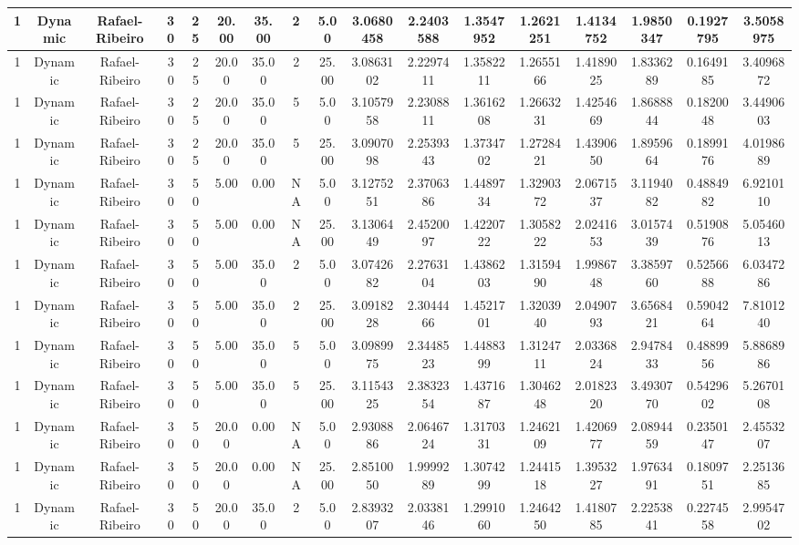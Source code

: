 \documentclass[a4paper]{article}
\begin{document}
\begin{center}
\begin{tabular}{ | c | c | c | c | c | c | c | c | c | c | c | c | c | c | c | c | c | }
		1	&	Dynamic	&	Rafael-Ribeiro	&	30	&	25	&	20.00	&	35.00	&	2	&	5.00	&	3.0680458	&	2.2403588	&	1.3547952	&	1.2621251	&	1.4134752	&	1.9850347	&	0.1927795	&	3.5058975 \\
		\hline
		1	&	Dynamic	&	Rafael-Ribeiro	&	30	&	25	&	20.00	&	35.00	&	2	&	25.00	&	3.0863102	&	2.2297411	&	1.3582211	&	1.2655166	&	1.4189025	&	1.8336289	&	0.1649185	&	3.4096872 \\
		\hline
		1	&	Dynamic	&	Rafael-Ribeiro	&	30	&	25	&	20.00	&	35.00	&	5	&	5.00	&	3.1057958	&	2.2308811	&	1.3616208	&	1.2663231	&	1.4254669	&	1.8688844	&	0.1820048	&	3.4490603 \\
		\hline
		1	&	Dynamic	&	Rafael-Ribeiro	&	30	&	25	&	20.00	&	35.00	&	5	&	25.00	&	3.0907098	&	2.2539343	&	1.3734702	&	1.2728421	&	1.4390650	&	1.8959664	&	0.1899176	&	4.0198689 \\
		\hline
		1	&	Dynamic	&	Rafael-Ribeiro	&	30	&	50	&	5.00	&	0.00	&	NA	&	5.00	&	3.1275251	&	2.3706386	&	1.4489734	&	1.3290372	&	2.0671537	&	3.1194082	&	0.4884982	&	6.9210110 \\
		\hline
		1	&	Dynamic	&	Rafael-Ribeiro	&	30	&	50	&	5.00	&	0.00	&	NA	&	25.00	&	3.1306449	&	2.4520097	&	1.4220722	&	1.3058222	&	2.0241653	&	3.0157439	&	0.5190876	&	5.0546013 \\
		\hline
		1	&	Dynamic	&	Rafael-Ribeiro	&	30	&	50	&	5.00	&	35.00	&	2	&	5.00	&	3.0742682	&	2.2763104	&	1.4386203	&	1.3159490	&	1.9986748	&	3.3859760	&	0.5256688	&	6.0347286 \\
		\hline
		1	&	Dynamic	&	Rafael-Ribeiro	&	30	&	50	&	5.00	&	35.00	&	2	&	25.00	&	3.0918228	&	2.3044466	&	1.4521701	&	1.3203940	&	2.0490793	&	3.6568421	&	0.5904264	&	7.8101240 \\
		\hline
		1	&	Dynamic	&	Rafael-Ribeiro	&	30	&	50	&	5.00	&	35.00	&	5	&	5.00	&	3.0989975	&	2.3448523	&	1.4488399	&	1.3124711	&	2.0336824	&	2.9478433	&	0.4889956	&	5.8868986 \\
		\hline
		1	&	Dynamic	&	Rafael-Ribeiro	&	30	&	50	&	5.00	&	35.00	&	5	&	25.00	&	3.1154325	&	2.3832354	&	1.4371687	&	1.3046248	&	2.0182320	&	3.4930770	&	0.5429602	&	5.2670108 \\
		\hline
		1	&	Dynamic	&	Rafael-Ribeiro	&	30	&	50	&	20.00	&	0.00	&	NA	&	5.00	&	2.9308886	&	2.0646724	&	1.3170331	&	1.2462109	&	1.4206977	&	2.0894459	&	0.2350147	&	2.4553207 \\
		\hline
		1	&	Dynamic	&	Rafael-Ribeiro	&	30	&	50	&	20.00	&	0.00	&	NA	&	25.00	&	2.8510050	&	1.9999289	&	1.3074299	&	1.2441518	&	1.3953227	&	1.9763491	&	0.1809751	&	2.2513685 \\
		\hline
		1	&	Dynamic	&	Rafael-Ribeiro	&	30	&	50	&	20.00	&	35.00	&	2	&	5.00	&	2.8393207	&	2.0338146	&	1.2991060	&	1.2464250	&	1.4180785	&	2.2253841	&	0.2274558	&	2.9954702 \\

\end{tabular}
\end{center}
\end{document}
